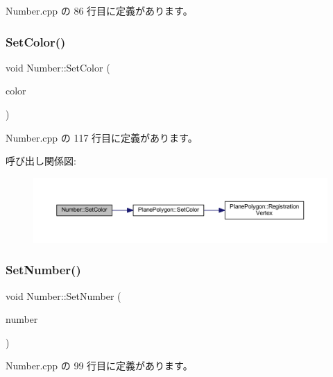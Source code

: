  Number.\+cpp の 86 行目に定義があります。

\mbox{\label{class_number_a1ea98cdee888a040f4530a6654657c44}} 
\subsubsection{\texorpdfstring{Set\+Color()}{SetColor()}}
{\footnotesize\ttfamily void Number\+::\+Set\+Color (\begin{DoxyParamCaption}\item[{\mbox{\hyperlink{_vector3_d_8h_a680c30c4a07d86fe763c7e01169cd6cc}{X\+Color4}}}]{color }\end{DoxyParamCaption})}



 Number.\+cpp の 117 行目に定義があります。

呼び出し関係図\+:\nopagebreak
\begin{figure}[H]
\begin{center}
\leavevmode
\includegraphics[width=350pt]{class_number_a1ea98cdee888a040f4530a6654657c44_cgraph}
\end{center}
\end{figure}
\mbox{\label{class_number_ac825b1ee1f46a6ac4ffd3bc904964745}} 
\subsubsection{\texorpdfstring{Set\+Number()}{SetNumber()}}
{\footnotesize\ttfamily void Number\+::\+Set\+Number (\begin{DoxyParamCaption}\item[{int}]{number }\end{DoxyParamCaption})}



 Number.\+cpp の 99 行目に定義があります。

